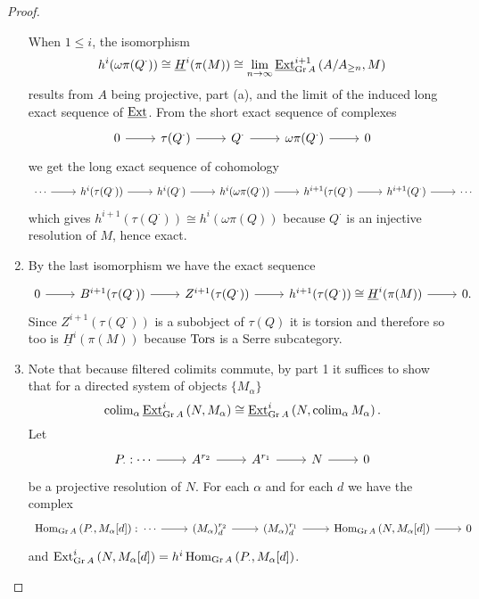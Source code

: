 \documentclass[dissertation.tex]{subfiles}
\begin{document}
\begin{prop}
\begin{proof}
\begin{enumerate}
      When $1 \leq i$, the isomorphism 
      $$h^i(\omega\pi(Q^\cdot)) \cong \underline{H}^i(\pi(M)) \cong \lim_{n \rightarrow \infty}\operatorname{\underline{Ext}}^{i+1}_{\operatorname{Gr}A}\left(A/A_{\geq n}, M\right)$$ 
      results from $A$ being projective, part (a), and the limit of the induced long exact sequence of $\operatorname{\underline{Ext}}$.
      From the short exact sequence of complexes
      $$\begin{tikzcd}
        0 \arrow{r} & \tau(Q^\cdot) \arrow{r} & Q^\cdot \arrow{r} & \omega\pi(Q^\cdot) \arrow{r} & 0
      \end{tikzcd}$$
      we get the long exact sequence of cohomology
      $$\begin{tikzcd}
        \cdots \arrow{r} & h^i(\tau(Q^\cdot)) \arrow{r} & h^i(Q^\cdot) \arrow{r} & h^i(\omega\pi(Q^\cdot)) \arrow{r} & h^{i+1}(\tau(Q^\cdot) \arrow{r} & h^{i+1}(Q^\cdot) \arrow{r} & \cdots
      \end{tikzcd}$$
      which gives $h^{i+1}(\tau(Q^\cdot)) \cong h^i(\omega\pi(Q))$ because $Q^\cdot$ is an injective resolution of $M$, hence exact.
    \item
      By the last isomorphism we have the exact sequence
      $$\begin{tikzcd}
        0 \arrow{r} & B^{i+1}(\tau(Q^\cdot)) \arrow{r} & Z^{i + 1} (\tau(Q^\cdot)) \arrow{r} & h^{i+1}(\tau(Q^\cdot)) \cong \underline{H}^i(\pi(M)) \arrow{r} & 0.
      \end{tikzcd}$$
      Since $Z^{i+1}(\tau(Q^\cdot))$ is a subobject of $\tau(Q)$ it is torsion and therefore so too is $\underline{H}^i(\pi(M))$ because $\Tors$ is a Serre subcategory.
    \item
      Note that because filtered colimits commute, by part 1 it suffices to show that for a directed system of objects $\{M_\alpha\}$
      $$\operatorname{colim}_{\alpha}\operatorname{\underline{Ext}}^{i}_{\operatorname{Gr}A}\left(N,M_\alpha\right) \cong \operatorname{\underline{Ext}}^{i}_{\operatorname{Gr}A}\left(N,\operatorname{colim}_{\alpha} M_\alpha\right).$$
      Let 
      $$\begin{tikzcd}
        P_\cdot : \cdots \arrow{r} & A^{r_2} \arrow{r} & A^{r_1} \arrow{r} & N \arrow{r} & 0
      \end{tikzcd}$$
      be a projective resolution of $N$.
      For each $\alpha$ and for each $d$ we have the complex
      $$\begin{tikzcd}
        \Hom{\Gr{A}}{P_\cdot, M_\alpha[d]} \colon \cdots \arrow{r} & (M_\alpha)_d^{r_2} \arrow{r} & (M_\alpha)_d^{r_1} \arrow{r} & \Hom{\Gr{A}}{N, M_\alpha[d]} \arrow{r} & 0
      \end{tikzcd}$$
      and $\operatorname{Ext}^{i}_{\operatorname{Gr}A}\left(N, M_\alpha[d]\right) = h^i\operatorname{Hom}_{\operatorname{Gr}A}\left(P_\cdot, M_\alpha[d]\right)$.

\end{enumerate}
\end{proof}
\end{prop}
\end{document}
